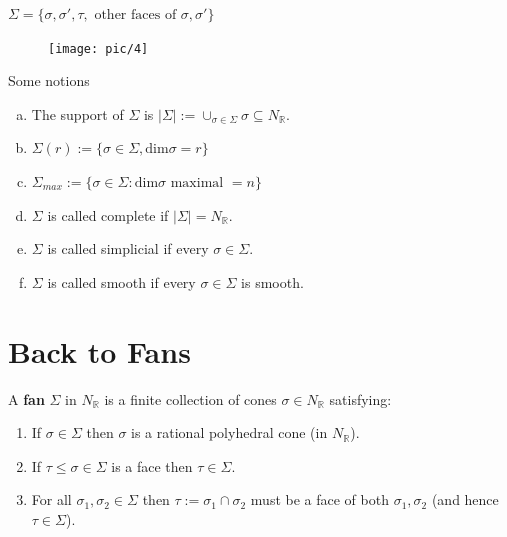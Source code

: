 \documentclass[a4paper,12pt]{amsart}
\newcommand{\R}{\ensuremath{\mathbb{R}}}
\begin{document}
\begin{Eg}$\Sigma=\{\sigma, \sigma',\tau,\text{ other faces of }\sigma, \sigma'\}$
\begin{figure}[h!]\centering
	\texttt{[image: pic/4]}
\end{figure}
\end{Eg}
Some notions
\begin{enumerate}[a)]
	\item The support of $\Sigma$ is $|\Sigma|:=\cup_{\sigma\in\Sigma}\sigma \subseteq N_\R$.
	\item $\Sigma(r):=\{\sigma\in\Sigma, \text{dim}\sigma=r\}$
	\item $\Sigma_{max}:=\{\sigma \in \Sigma: \text{dim}\sigma\text{ maximal }= n\}$
	\item $ \Sigma $ is called complete if $|\Sigma|=N_\R$.
	\item $\Sigma$ is called simplicial if every $\sigma \in \Sigma$.
	\item $\Sigma$ is called smooth if every $\sigma\in \Sigma$ is smooth.
\end{enumerate}

\newpage
\section{Back to Fans}

\begin{Def}
	A {\bf fan} $\Sigma$ in $N_{\mathbb{R}}$ is a finite collection of cones $\sigma \in N_{\mathbb{R}}$ satisfying:
	\begin{enumerate}
		\item If $\sigma \in \Sigma$ then $\sigma$ is a rational polyhedral cone (in $N_{\mathbb{R}}$).
		\item If $\tau \leq \sigma \in \Sigma$ is a face then $\tau \in \Sigma$.
		\item For all $\sigma_1, \sigma_2 \in \Sigma$ then $\tau := \sigma_1 \cap \sigma_2$ must be a face of both $\sigma_1, \sigma_2$ (and hence $\tau \in \Sigma$).
	\end{enumerate}
\end{Def}
\end{document}
